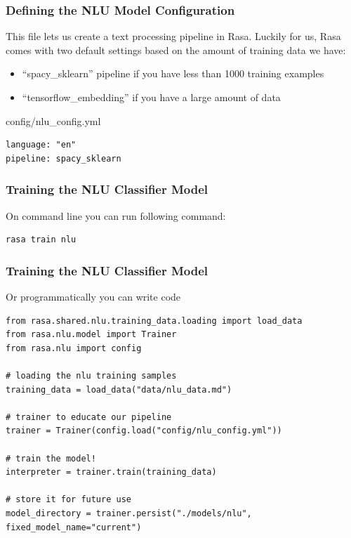  \begin{frame}[fragile]\frametitle{Defining the NLU Model Configuration}
This file lets us create a text processing pipeline in Rasa. Luckily for us, Rasa comes with two default settings based on the amount of training data we have:

\begin{itemize}
\item ``spacy\_sklearn'' pipeline if you have less than 1000 training examples
\item ``tensorflow\_embedding'' if you have a large amount of data
\end{itemize}

config/nlu\_config.yml
 
\begin{lstlisting}
language: "en"
pipeline: spacy_sklearn
\end{lstlisting}

\end{frame}

 \begin{frame}[fragile]\frametitle{Training the NLU Classifier Model}
On command line you can run following command:

\begin{lstlisting}
rasa train nlu
\end{lstlisting}

\end{frame}

 \begin{frame}[fragile]\frametitle{Training the NLU Classifier Model}
 Or programmatically you can write code
 
\begin{lstlisting}
from rasa.shared.nlu.training_data.loading import load_data
from rasa.nlu.model import Trainer
from rasa.nlu import config

# loading the nlu training samples
training_data = load_data("data/nlu_data.md")

# trainer to educate our pipeline
trainer = Trainer(config.load("config/nlu_config.yml"))

# train the model!
interpreter = trainer.train(training_data)

# store it for future use
model_directory = trainer.persist("./models/nlu", fixed_model_name="current")
\end{lstlisting}

\end{frame}


